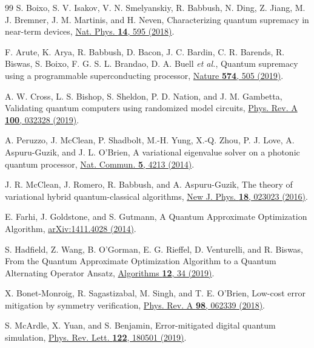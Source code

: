 \documentclass[aps,pra,reprint,superscriptaddress,floatfix,nofootinbib]{revtex4-2}
\begin{document}
\begin{thebibliography}{99}
S. Boixo, S. V. Isakov, V. N. Smelyanskiy, R. Babbush, N. Ding, Z. Jiang, M. J. Bremner, J. M. Martinis, and H. Neven, Characterizing quantum supremacy in near-term devices, \href{https://doi.org/10.1038/s41567-018-0124-x}{Nat. Phys. \textbf{14}, 595 (2018)}.

F. Arute, K. Arya, R. Babbush, D. Bacon, J. C. Bardin, C. R. Barends, R. Biswas, S. Boixo, F. G. S. L. Brandao, D. A. Buell \textit{et al.}, Quantum supremacy using a programmable superconducting processor, \href{https://doi.org/10.1038/s41586-019-1666-5}{Nature \textbf{574}, 505 (2019)}.

A. W. Cross, L. S. Bishop, S. Sheldon, P. D. Nation, and J. M. Gambetta, Validating quantum computers using randomized model circuits, \href{https://doi.org/10.1103/PhysRevA.100.032328}{Phys. Rev. A \textbf{100}, 032328 (2019)}.

A. Peruzzo, J. McClean, P. Shadbolt, M.-H. Yung, X.-Q. Zhou, P. J. Love, A. Aspuru-Guzik, and J. L. O'Brien, A variational eigenvalue solver on a photonic quantum processor, \href{https://doi.org/10.1038/ncomms5213}{Nat. Commun. \textbf{5}, 4213 (2014)}.

J. R. McClean, J. Romero, R. Babbush, and A. Aspuru-Guzik, The theory of variational hybrid quantum-classical algorithms, \href{https://doi.org/10.1088/1367-2630/18/2/023023}{New J. Phys. \textbf{18}, 023023 (2016)}.

E. Farhi, J. Goldstone, and S. Gutmann, A Quantum Approximate Optimization Algorithm, \href{https://arxiv.org/abs/1411.4028}{arXiv:1411.4028 (2014)}.

S. Hadfield, Z. Wang, B. O'Gorman, E. G. Rieffel, D. Venturelli, and R. Biswas, From the Quantum Approximate Optimization Algorithm to a Quantum Alternating Operator Ansatz, \href{https://doi.org/10.3390/a12020034}{Algorithms \textbf{12}, 34 (2019)}.

X. Bonet-Monroig, R. Sagastizabal, M. Singh, and T. E. O'Brien, Low-cost error mitigation by symmetry verification, \href{https://doi.org/10.1103/PhysRevA.98.062339}{Phys. Rev. A \textbf{98}, 062339 (2018)}.

S. McArdle, X. Yuan, and S. Benjamin, Error-mitigated digital quantum simulation, \href{https://doi.org/10.1103/PhysRevLett.122.180501}{Phys. Rev. Lett. \textbf{122}, 180501 (2019)}.


\end{thebibliography}
\end{document}
